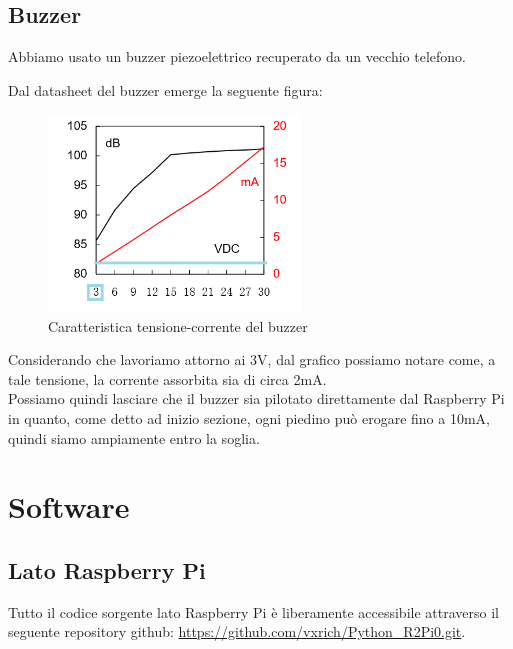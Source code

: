 \documentclass[12pt]{article}
\newcommand{\imgszland}{0.6\textwidth}
\newcommand{\raspi}{Raspberry Pi}
\begin{document}
\subsection{Buzzer}

Abbiamo usato un buzzer piezoelettrico recuperato da un vecchio telefono.

Dal datasheet del buzzer emerge la seguente figura:
\begin{figure}[h]
\includegraphics[width=\imgszland]{buzzerDS}
\centering
\caption{Caratteristica tensione-corrente del buzzer}
\label{fig:buzzerDS}
\end{figure}

Considerando che lavoriamo attorno ai 3V, dal grafico possiamo notare come, a tale tensione, la corrente assorbita sia di circa 2mA.\\
Possiamo quindi lasciare che il buzzer sia pilotato direttamente dal \raspi{} in quanto, come detto ad inizio sezione, ogni piedino può erogare fino a 10mA, quindi siamo ampiamente entro la soglia.


\section{Software}

\subsection{Lato \raspi}

\begin{minipage}{\linewidth}
Tutto il codice sorgente lato \raspi{} è liberamente accessibile attraverso il seguente repository github:  \url{https://github.com/vxrich/Python_R2Pi0.git}.
\end{minipage}
\end{document}
